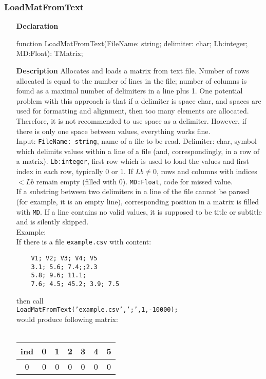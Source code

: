 \documentclass[12pt,a4paper,oneside]{report}
\newcommand{\declarationitem}[1]{\textbf{#1}}
\newcommand{\descriptiontitle}[1]{\textbf{#1}}
\newcommand{\code}[1]{\texttt{#1}}
\begin{document}
\subsubsection{LoadMatFromText}\label{uvecfileutils:LoadMatFromText}
\begin{itemize}
	\item[\declarationitem{Declaration}\hfill]
	\begin{flushleft}
	function LoadMatFromText(FileName: string; delimiter: char; Lb:integer; MD:Float): TMatrix;
	\end{flushleft}
	\item[\descriptiontitle{Description}] Allocates and loads a matrix from text file. Number of rows allocated is equal to the number of lines in the file; number of columns is found as a maximal number of delimiters in a line plus 1. One potential problem with this approach is that if a delimiter is space char, and spaces are used for formatting and alignment, then too many elements are allocated. Therefore, it is not recommended to use space as a delimiter. However, if there is only one space between values, everything works fine.\\
	Input: \code{FileName: string}, name of a file to be read. Delimiter: char, symbol which delimits values within a line of a file (and, correspondingly, in a row of a matrix). \code{Lb:integer}, first row which is used to load the values and first index in each row, typically 0 or 1. If $Lb \ne 0$, rows and columns with indices $<Lb$ remain empty (filled with 0). \code{MD:Float}, code for missed value.\\
	If a substring between two delimiters in a line of the file cannot be parsed (for example, it is an empty line), corresponding position in a matrix is filled with \code{MD}. If a line contains no valid values, it is supposed to be title or subtitle and is silently skipped. \\
	Example:\\
	If there is a file \code{example.csv} with content:
	\begin{verbatim}
	V1; V2; V3; V4; V5
	3.1; 5.6; 7.4;;2.3
	5.8; 9.6; 11.1;
	7.6; 4.5; 45.2; 3.9; 7.5
	\end{verbatim}
	then call\\
	\code{LoadMatFromText('example.csv',';',1,-10000);}\\ would produce following matrix: \\ \\
	\begin{tabular}{c|cccccc}
		ind & 0 & 1 & 2 & 3 & 4 & 5 \\
		\hline 
		0 & 0 & 0 & 0 & 0 & 0 & 0 \\ 
		

\end{tabular}
\end{itemize}
\end{document}
